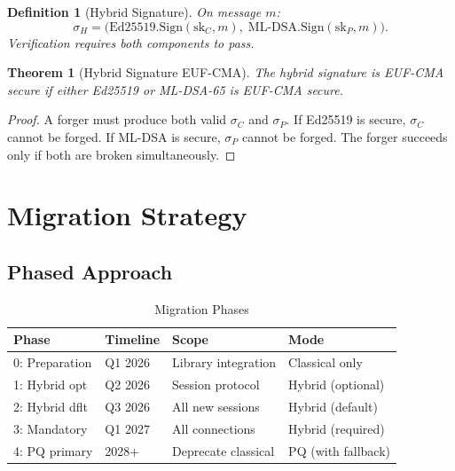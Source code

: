 \documentclass[11pt,a4paper]{article}
\newtheorem{definition}{Definition}[section]
\newtheorem{theorem}{Theorem}[section]
\begin{document}
\begin{definition}[Hybrid Signature]
    On message $m$:
    \[
        \sigma_H = \bigl(
            \mathrm{Ed25519.Sign}(\mathrm{sk}_C, m),\;
            \mathrm{ML\text{-}DSA.Sign}(\mathrm{sk}_P, m)
        \bigr).
    \]
    Verification requires both components to pass.
\end{definition}

\begin{theorem}[Hybrid Signature EUF-CMA]
    The hybrid signature is EUF-CMA secure if either Ed25519 or ML-DSA-65
    is EUF-CMA secure.
\end{theorem}

\begin{proof}
    A forger must produce both valid $\sigma_C$ and $\sigma_P$.  If
    Ed25519 is secure, $\sigma_C$ cannot be forged.  If ML-DSA is
    secure, $\sigma_P$ cannot be forged.  The forger succeeds only if
    both are broken simultaneously.
\end{proof}

\section{Migration Strategy}
\label{sec:migration}

\subsection{Phased Approach}

\begin{table}[h]
\centering
\caption{Migration Phases}
\label{tab:phases}
\begin{tabular}{@{}llll@{}}
\toprule
\textbf{Phase} & \textbf{Timeline} & \textbf{Scope} & \textbf{Mode} \\
\midrule
0: Preparation & Q1 2026 & Library integration  & Classical only \\
1: Hybrid opt  & Q2 2026 & Session protocol     & Hybrid (optional) \\
2: Hybrid dflt & Q3 2026 & All new sessions     & Hybrid (default) \\
3: Mandatory   & Q1 2027 & All connections      & Hybrid (required) \\
4: PQ primary  & 2028+   & Deprecate classical  & PQ (with fallback) \\
\bottomrule
\end{tabular}
\end{table}
\end{document}
